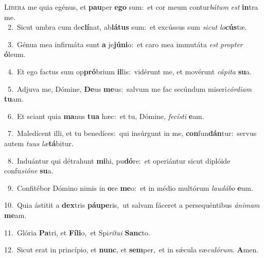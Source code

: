 \lettrine{\initial\textcolor{\initialcolor}{L}}{íbera} me quia egénus, et \textbf{pau}\-per \textbf{e}\-\textbf{go} sum:~\star et cor meum contur\-\textit{bá}\-\textit{tum} \textit{est} \textbf{in}\-tra me.\\
{\numbfont\textcolor{\numbcolor}{~2.}}~Sicut umbra cum de\-\textbf{clí}\-nat, ab\-\textbf{lá}\-\textbf{tus} sum:~\star et excússus sum \textit{sic}\-\textit{ut} \textit{lo}\-\textbf{cús}tæ.\par
{\numbfont\textcolor{\numbcolor}{~3.}}~Génua mea infirmáta sunt \textbf{a} je\-\textbf{jú}\-\textbf{ni}o:~\star et caro mea immutáta \textit{est} \textit{prop}\-\textit{ter} \textbf{ó}\-leum.\par
{\numbfont\textcolor{\numbcolor}{~4.}}~Et ego factus sum op\-\textbf{pró}\-brium \textbf{il}\-lis:~\star vidérunt me, et movérunt \textit{cá}\-\textit{pi}\textit{ta} \textbf{su}\-a.\par
{\numbfont\textcolor{\numbcolor}{~5.}}~Adjuva me, Dómine, \textbf{De}\-us \textbf{me}\-us:~\star salvum me fac secúndum miseri\-\textit{cór}\-\textit{di}\textit{am} \textbf{tu}\-am.\par
{\numbfont\textcolor{\numbcolor}{~6.}}~Et sciant quia \textbf{ma}\-nus \textbf{tu}\-\textbf{a} hæc:~\star et tu, Dómine, \textit{fe}\-\textit{cís}\textit{ti} \textbf{e}\-am.\par
{\numbfont\textcolor{\numbcolor}{~7.}}~Maledícent illi, et tu benedíces:~\dagger qui insúrgunt in me, \textbf{con}\-fun\-\textbf{dán}\-tur:~\star servus autem \textit{tu}\-\textit{us} \textit{læ}\-\textbf{tá}bitur.\par
{\numbfont\textcolor{\numbcolor}{~8.}}~Induántur qui détrahunt \textbf{mi}\-hi, pu\-\textbf{dó}\-re:~\star et operiántur sicut diplóide confu\-\textit{si}\-\textit{ó}\textit{ne} \textbf{su}\-a.\par
{\numbfont\textcolor{\numbcolor}{~9.}}~Confitébor Dómino nimis in \textbf{o}\-re \textbf{me}\-o:~\star et in médio multórum \textit{lau}\-\textit{dá}\textit{bo} \textbf{e}\-um.\par
{\numbfont\textcolor{\numbcolor}{10.}}~Quia ástitit a \textbf{dex}\-tris \textbf{páu}\-\textbf{pe}ris,~\star ut salvam fáceret a persequéntibus \textit{á}\-\textit{ni}\textit{mam} \textbf{me}\-am.\par
{\numbfont\textcolor{\numbcolor}{11.}}~Glória \textbf{Pa}\-tri, et \textbf{Fí}\-\textbf{li}o,~\star et Spi\-\textit{rí}\-\textit{tu}\textit{i} \textbf{Sanc}\-to.\par
{\numbfont\textcolor{\numbcolor}{12.}}~Sicut erat in princípio, et \textbf{nunc}\-, et \textbf{sem}\-per,~\star et in sǽcula sæ\-\textit{cu}\-\textit{ló}\textit{rum}. \textbf{A}\-men.\par
